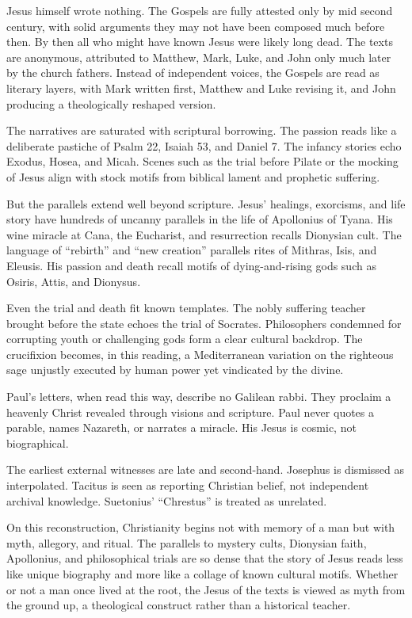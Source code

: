 Jesus himself wrote nothing.
The Gospels are fully attested only by mid second century, with solid arguments they may not have been composed much before then.
By then all who might have known Jesus were likely long dead.
The texts are anonymous, attributed to Matthew, Mark, Luke, and John only much later by the church fathers.
Instead of independent voices, the Gospels are read as literary layers, with Mark written first, Matthew and Luke revising it, and John producing a theologically reshaped version.

The narratives are saturated with scriptural borrowing.
The passion reads like a deliberate pastiche of Psalm 22, Isaiah 53, and Daniel 7.
The infancy stories echo Exodus, Hosea, and Micah.
Scenes such as the trial before Pilate or the mocking of Jesus align with stock motifs from biblical lament and prophetic suffering.

But the parallels extend well beyond scripture.
Jesus’ healings, exorcisms, and life story have hundreds of uncanny parallels in the life of Apollonius of Tyana.
His wine miracle at Cana, the Eucharist, and resurrection recalls Dionysian cult.
The language of “rebirth” and “new creation” parallels rites of Mithras, Isis, and Eleusis.
His passion and death recall motifs of dying-and-rising gods such as Osiris, Attis, and Dionysus.

Even the trial and death fit known templates.
The nobly suffering teacher brought before the state echoes the trial of Socrates.
Philosophers condemned for corrupting youth or challenging gods form a clear cultural backdrop.
The crucifixion becomes, in this reading, a Mediterranean variation on the righteous sage unjustly executed by human power yet vindicated by the divine.

Paul’s letters, when read this way, describe no Galilean rabbi.
They proclaim a heavenly Christ revealed through visions and scripture.
Paul never quotes a parable, names Nazareth, or narrates a miracle.
His Jesus is cosmic, not biographical.

The earliest external witnesses are late and second-hand.
Josephus is dismissed as interpolated.
Tacitus is seen as reporting Christian belief, not independent archival knowledge.
Suetonius’ “Chrestus” is treated as unrelated.

On this reconstruction, Christianity begins not with memory of a man but with myth, allegory, and ritual.
The parallels to mystery cults, Dionysian faith, Apollonius, and philosophical trials are so dense that the story of Jesus reads less like unique biography and more like a collage of known cultural motifs.
Whether or not a man once lived at the root, the Jesus of the texts is viewed as myth from the ground up, a theological construct rather than a historical teacher.

